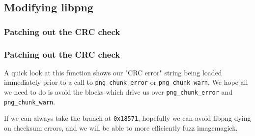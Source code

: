 \documentclass{beamer}
\begin{document}
\subsection{Modifying libpng}

\begin{frame}
\frametitle{Patching out the CRC check}
\end{frame}

\begin{frame}
\frametitle{Patching out the CRC check}
A quick look at this function shows our "CRC error" string being loaded
immediately prior to a call to \texttt{png\_chunk\_error} or
\texttt{png\_chunk\_warn}. We hope all we need to do is avoid the blocks which
drive us over \texttt{png\_chunk\_error} and \texttt{png\_chunk\_warn}.
\par
If we can always take the branch at \texttt{0x18571}, hopefully we can avoid
libpng dying on checksum errors, and we will be able to more efficiently fuzz
imagemagick.
\end{frame}
\end{document}
